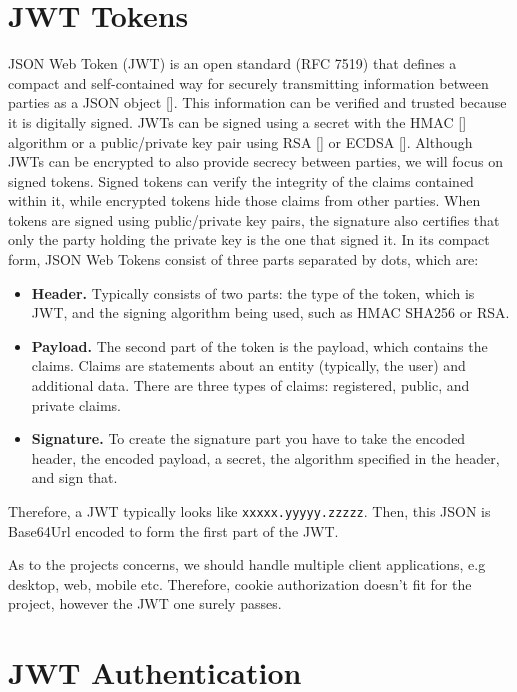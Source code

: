 \section{JWT Tokens}\label{sec:jwt-tokens}
JSON Web Token (JWT) is an open standard (RFC 7519) that defines a compact and self-contained way for securely
transmitting information between parties as a JSON object [\cite{jones2015json}].
This information can be verified and trusted because it is digitally signed.
JWTs can be signed using a secret with the HMAC [\cite{wang2004hmac}] algorithm or a public/private key pair using
RSA [\cite{wiener1990cryptanalysis}] or ECDSA [\cite{johnson2001elliptic}].
Although JWTs can be encrypted to also provide secrecy between parties, we will focus on signed tokens.
Signed tokens can verify the integrity of the claims contained within it, while encrypted tokens hide those claims from
other parties.
When tokens are signed using public/private key pairs, the signature also certifies that only the party holding the
private key is the one that signed it.
In its compact form, JSON Web Tokens consist of three parts separated by dots, which are:
\begin{itemize}
    \item \textbf{Header.} Typically consists of two parts: the type of the token, which is JWT, and the signing algorithm
    being used, such as HMAC SHA256 or RSA\@.
    \item \textbf{Payload.} The second part of the token is the payload, which contains the claims.
    Claims are statements about an entity (typically, the user) and additional data.
    There are three types of claims: registered, public, and private claims.
    \item \textbf{Signature.} To create the signature part you have to take the encoded header, the encoded payload, a secret,
    the algorithm specified in the header, and sign that.
\end{itemize}
Therefore, a JWT typically looks like \texttt{xxxxx.yyyyy.zzzzz}.
Then, this JSON is Base64Url encoded to form the first part of the JWT\@.

As to the projects concerns, we should handle multiple client applications, e.g desktop,
web, mobile etc.
Therefore, cookie authorization doesn't fit for the project, however the JWT one surely passes.


\section{JWT Authentication}\label{sec:jwt-authentication}
